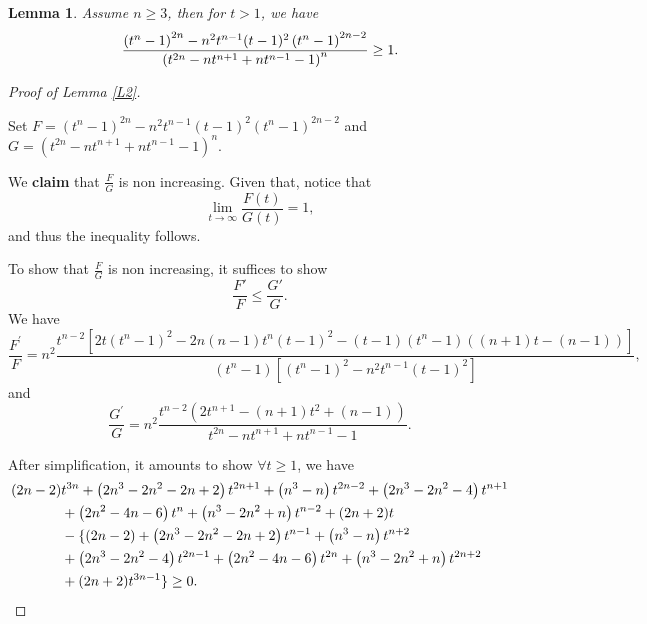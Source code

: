 \documentclass[12pt]{amsart}
\newtheorem{lemma}{Lemma}
\numberwithin{equation}{section}
\numberwithin{lemma}{section}
\numberwithin{proposition}{section}
\numberwithin{corollary}{section}
\numberwithin{remark}{section}
\begin{document}
\begin{lemma} 
Assume $n\geq 3$, then for $t>1$, we have 
\begin{align} \notag 
\frac{\left(t^n-1\right)^{2 n}-n^2 t^{n-1}(t-1)^2\left(t^n-1\right)^{2 n-2}}{\left(t^{2 n}-n t^{n+1}+n t^{n-1}-1\right)^n} \geq 1.
\end{align}
\end{lemma}

\begin{proof}[Proof of Lemma \ref{L2}]
\ 

Set $F=\left(t^n-1\right)^{2 n}-n^2 t^{n-1}(t-1)^2\left(t^n-1\right)^{2 n-2}$ and $
G=\left(t^{2 n}-n t^{n+1}+n t^{n-1}-1\right)^n$.

We \textbf{claim} that $\frac{F}{G}$ is non increasing. Given that, notice that 
\[
\lim_{t\to \infty} \frac{F(t)}{G(t)}=1,
\]
and thus the inequality follows. 

To show that $\frac{F}{G}$ is non increasing, it suffices to show 
\[
\frac{F'}{F}\leq \frac{G'}{G}.
\]
We have
\[
\frac{F^{\prime}}{F}=n^2 \frac{t^{n-2}\left[2 t\left(t^n-1\right)^2-2 n(n-1) t^n(t-1)^2-(t-1)\left(t^n-1\right)((n+1) t-(n-1))\right]}{\left(t^n-1\right)\left[\left(t^n-1\right)^2-n^2 t^{n-1}(t-1)^2\right]},
\]
and
\[
\frac{G^{\prime}}{G}=n^2 \frac{t^{n-2}\left(2 t^{ n+1}-(n+1) t^2+(n-1) \right)}{t^{2 n}-n t^{n+1}+n t^{n-1}-1}.
\]

After simplification, it amounts to show $\forall t \geq 1$, we have 
\begin{align} \notag
(2 n-2)  &t^{3 n}+\left(2 n^3-2 n^2-2 n+2\right) t^{2 n+1}+\left(n^3-n\right) t^{2 n-2}+\left(2 n^3-2 n^2-4\right) t^{n+1} \\ \notag
& +\left(2 n^2-4 n-6\right) t^n+\left(n^3-2 n^2+n\right) t^{n-2}+(2 n+2) t \\\notag
& -\{ (2 n-2)+\left(2 n^3-2 n^2-2 n+2\right) t^{n-1}+\left(n^3-n\right) t^{n+2} \\\notag
& +\left(2 n^3-2 n^2-4\right) t^{2 n-1}+\left(2 n^2-4 n-6\right) t^{2 n}+\left(n^3-2 n^2+n\right) t^{2 n+2} \\ \notag
& +(2 n+2) t^{3 n-1} \}\geq 0.
\end{align}


\end{proof}
\end{document}
